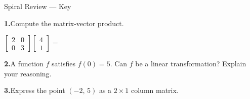 \documentclass[10pt]{article}
\begin{document}
\namedateperiod

\vspace{0.12in}

\begin{notesbox}{Spiral Review --- Key}
\small

\textbf{1.}\quad Compute the matrix-vector product.

\vspace{0.08in}
\hspace{1em}
$\begin{bmatrix}2 & 0 \\ 0 & 3\end{bmatrix}
 \begin{bmatrix}4 \\ 1\end{bmatrix} = $

\vspace{0.22in}

\textbf{2.}\quad A function $f$ satisfies $f(0) = 5$.
Can $f$ be a linear transformation?  Explain your reasoning.

\vspace{0.08in}

\vspace{0.10in}

\textbf{3.}\quad Express the point $(-2,\, 5)$ as a $2 \times 1$ column matrix.

\vspace{0.08in}
\hspace{1em} 

\end{notesbox}
\end{document}
